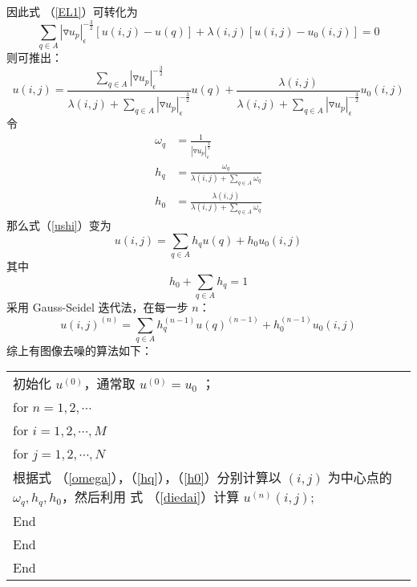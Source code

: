 因此式 （\ref{EL1}）可转化为
\begin{equation}
\sum_{q \in A} |\triangledown u_p|_\epsilon^{-\frac{3}{2}}[u(i,j)-u(q)]+\lambda (i,j)[u(i,j)-u_0(i,j)]=0
\end{equation}
则可推出：
\begin{equation}
\label{ushi}
u(i,j)=\frac{\sum_{q \in A} |\triangledown u_p|_\epsilon^{-\frac{3}{2}}}{\lambda (i,j)+\sum_{q \in A} |\triangledown u_p|_\epsilon^{-\frac{3}{2}}}u(q)+\frac{\lambda (i,j)}{\lambda (i,j)+\sum_{q \in A} |\triangledown u_p|_\epsilon^{-\frac{3}{2}}}u_0(i,j)
\end{equation}
令
\begin{align}
\label{omega}
\omega_q&=\frac{1}{|\triangledown u_p|_\epsilon^{\frac{3}{2}}} \\
\label{hq}
h_q&=\frac{\omega_q}{\lambda (i,j)+\sum_{q \in A} \omega _q} \\
\label{h0}
h_0&=\frac{\lambda (i,j)}{\lambda (i,j)+\sum_{q \in A} \omega _q}
\end{align}
那么式（\ref{ushi}）变为
\begin{equation}
u(i,j)=\sum_{q \in A}h_qu(q)+h_0u_0(i,j)
\end{equation}
其中
\begin{equation}
h_0+\sum_{q \in A}h_q=1
\end{equation}
采用 Gauss-Seidel 迭代法，在每一步 $n$：
\begin{equation}
\label{diedai}
u(i,j)^{(n)}=\sum_{q \in A}h_q^{(n-1)}u(q)^{(n-1)}+h_0^{(n-1)}u_0(i,j)
\end{equation}
综上有图像去噪的算法如下：

\begin{tabular}{|p{10cm}|}
\hline
初始化 $u^{(0)}$，通常取 $u^{(0)}=u_0$ ；\\
for $n=1,2,\cdots$  \\
 \quad for $i=1,2,\cdots,M$  \\
   \qquad for $j=1,2,\cdots,N$   \\
根据式 （\ref{omega}），（\ref{hq}），（\ref{h0}）分别计算以 $(i,j)$ 为中心点的 $\omega_q,h_q,h_0$，然后利用
式 （\ref{diedai}）计算 $u^{(n)}(i,j)$;\\
End \\
\quad End \\
    \qquad End \\
\hline
\end{tabular}